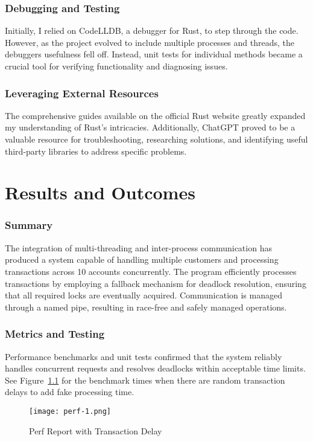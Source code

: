\documentclass[conference]{report}
\begin{document}
\subsection*{Debugging and Testing}
Initially, I relied on CodeLLDB, a debugger for Rust, to step through the code. However, as the project evolved to include multiple processes and threads, the debuggers usefulness fell off. Instead, unit tests for individual methods became a crucial tool for verifying functionality and diagnosing issues.

\subsection*{Leveraging External Resources}
The comprehensive guides available on the official Rust website greatly expanded my understanding of Rust’s intricacies. Additionally, ChatGPT proved to be a valuable resource for troubleshooting, researching solutions, and identifying useful third-party libraries to address specific problems.

\chapter{Results and Outcomes}

\subsection{Summary}

The integration of multi-threading and inter-process communication has produced a system capable of handling multiple customers and processing transactions across 10 accounts concurrently. The program efficiently processes transactions by employing a fallback mechanism for deadlock resolution, ensuring that all required locks are eventually acquired. Communication is managed through a named pipe, resulting in race-free and safely managed operations.

\subsection{Metrics and Testing}

Performance benchmarks and unit tests confirmed that the system reliably handles concurrent requests and resolves deadlocks within acceptable time limits. See Figure~\ref{fig:perf-1} for the benchmark times when there are random transaction delays to add fake processing time.

\begin{figure}[ht]
    \centering
    \texttt{[image: perf-1.png]}
    \caption{Perf Report with Transaction Delay}
    \label{fig:perf-1}
\end{figure}
\end{document}
